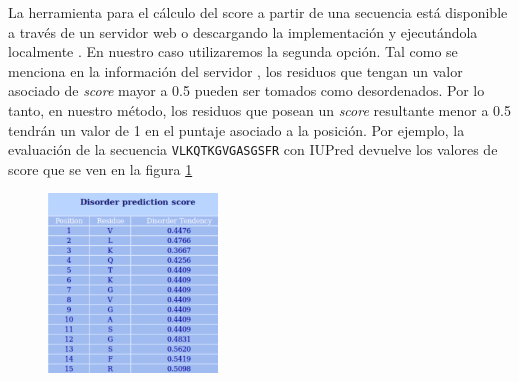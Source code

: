 % 
% 









La herramienta para el cálculo del score a partir de una secuencia está disponible a través de un servidor web \cite{iupredWeb,dosztanyi2005iupred} o descargando la implementación y ejecutándola localmente \cite{iupredDownload}.   
En nuestro caso utilizaremos la segunda opción. 
Tal como se menciona en la información del servidor \cite{dosztanyi2005iupred}, los residuos que tengan un valor asociado de \textit{score} mayor a 0.5 pueden ser tomados como desordenados.
Por lo tanto, en nuestro método, los residuos que posean un \textit{score} resultante menor a 0.5 tendrán un valor de 1 en el puntaje asociado a la posición.
Por ejemplo, la evaluación de la secuencia \texttt{VLKQTKGVGASGSFR} con IUPred devuelve los valores de score que se ven en la figura \ref{iupredResults}

\begin{figure}[h!]
\centering
\includegraphics[width=0.4\textwidth]{img/iupredTabla.png} 
\caption{}
\label{iupredResults}
\end{figure}

